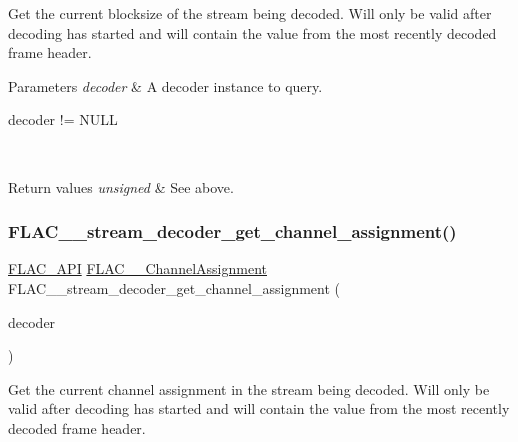 Get the current blocksize of the stream being decoded. Will only be valid after decoding has started and will contain the value from the most recently decoded frame header.


\begin{DoxyParams}{Parameters}
{\em decoder} & A decoder instance to query.  
\begin{DoxyCode}
decoder != NULL 
\end{DoxyCode}
 \\
\hline
\end{DoxyParams}

\begin{DoxyRetVals}{Return values}
{\em unsigned} & See above. \\
\hline
\end{DoxyRetVals}
\mbox{\label{group__flac__stream__decoder_gad7906d840eef5c15ef5c8fe4571d1172}} 
\subsubsection{\texorpdfstring{F\+L\+A\+C\+\_\+\+\_\+stream\+\_\+decoder\+\_\+get\+\_\+channel\+\_\+assignment()}{FLAC\_\_stream\_decoder\_get\_channel\_assignment()}}
{\footnotesize\ttfamily \hyperlink{group__flac__export_ga56ca07df8a23310707732b1c0007d6f5}{F\+L\+A\+C\+\_\+\+A\+PI} \hyperlink{group__flac__format_ga79855f8525672e37f299bbe02952ef9c}{F\+L\+A\+C\+\_\+\+\_\+\+Channel\+Assignment} F\+L\+A\+C\+\_\+\+\_\+stream\+\_\+decoder\+\_\+get\+\_\+channel\+\_\+assignment (\begin{DoxyParamCaption}\item[{\hyperlink{zconf_8h_a2c212835823e3c54a8ab6d95c652660e}{const} \hyperlink{struct_f_l_a_c_____stream_decoder}{F\+L\+A\+C\+\_\+\+\_\+\+Stream\+Decoder} $\ast$}]{decoder }\end{DoxyParamCaption})}

Get the current channel assignment in the stream being decoded. Will only be valid after decoding has started and will contain the value from the most recently decoded frame header.



